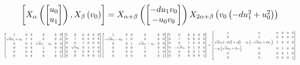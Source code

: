 \documentclass[11pt]{article}
\theoremstyle{definition}
\begin{document}
\[
\scaletoalign{\textwidth}{\left[ X_{\alpha}\left(\left[\begin{matrix}u_{0}\\u_{1}\end{matrix}\right]\right), X_{\beta}\left(v_{0}\right) \right] = X_{\alpha + \beta}\left(\left[\begin{matrix}- d u_{1} v_{0}\\- u_{0} v_{0}\end{matrix}\right]\right) X_{2\alpha + \beta}\left(v_{0} \left(- d u_{1}^{2} + u_{0}^{2}\right)\right)}
\]
\[
\scaletoalign{\textwidth}{{\left[\begin{matrix}1 & 0 & 0 & 0 & 0 & 0\\\sqrt{d} u_{1} + u_{0} & 1 & 0 & 0 & 0 & 0\\0 & 0 & 1 & \sqrt{d} u_{1} - u_{0} & 0 & 0\\0 & 0 & 0 & 1 & 0 & 0\\0 & 0 & 0 & 0 & 1 & 0\\0 & 0 & 0 & 0 & 0 & 1\end{matrix}\right]} {\left[\begin{matrix}1 & 0 & 0 & 0 & 0 & 0\\0 & 1 & 0 & 0 & 0 & 0\\0 & 0 & 1 & 0 & 0 & 0\\0 & \sqrt{d} v_{0} & 0 & 1 & 0 & 0\\0 & 0 & 0 & 0 & 1 & 0\\0 & 0 & 0 & 0 & 0 & 1\end{matrix}\right]} {\left[\begin{matrix}1 & 0 & 0 & 0 & 0 & 0\\- \sqrt{d} u_{1} - u_{0} & 1 & 0 & 0 & 0 & 0\\0 & 0 & 1 & - \sqrt{d} u_{1} + u_{0} & 0 & 0\\0 & 0 & 0 & 1 & 0 & 0\\0 & 0 & 0 & 0 & 1 & 0\\0 & 0 & 0 & 0 & 0 & 1\end{matrix}\right]} {\left[\begin{matrix}1 & 0 & 0 & 0 & 0 & 0\\0 & 1 & 0 & 0 & 0 & 0\\0 & 0 & 1 & 0 & 0 & 0\\0 & - \sqrt{d} v_{0} & 0 & 1 & 0 & 0\\0 & 0 & 0 & 0 & 1 & 0\\0 & 0 & 0 & 0 & 0 & 1\end{matrix}\right]} = {\left[\begin{matrix}1 & 0 & 0 & 0 & 0 & 0\\0 & 1 & 0 & 0 & 0 & 0\\\sqrt{d} v_{0} \left(- d u_{1}^{2} + u_{0}^{2}\right) & v_{0} \left(- \sqrt{d} u_{0} + d u_{1}\right) & 1 & 0 & 0 & 0\\- v_{0} \left(\sqrt{d} u_{0} + d u_{1}\right) & 0 & 0 & 1 & 0 & 0\\0 & 0 & 0 & 0 & 1 & 0\\0 & 0 & 0 & 0 & 0 & 1\end{matrix}\right]}}
\]
\end{document}
